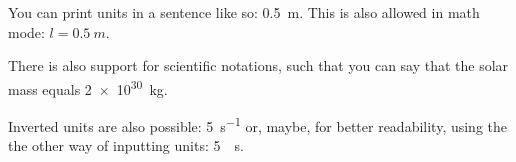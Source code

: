 
You can print units in a sentence
like so: \SI{0.5}{m}. This is also
allowed in math mode:
$l = \SI{0.5}{m}$.

There is also support for scientific
notations, such that you can say that
the solar mass equals \SI{2e30}{kg}.

Inverted units are also possible:
\SI{5}{s^{-1}} or, maybe, for
better readability, using the
the other way of inputting units:
\SI{5}{\per\second}.
